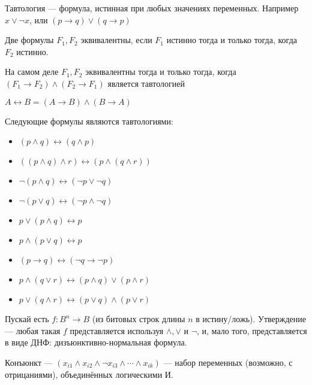 \begin{definition}
	Тавтология --- формула, истинная при любых значениях переменных. Например $x \lor \lnot x$, или $(p \to q) \lor (q \to p)$
\end{definition}
\begin{definition}
	Две формулы $F_1, F_2$ эквивалентны, если $F_1$ истинно тогда и только тогда, когда $F_2$ истинно.
\end{definition}

На самом деле $F_1, F_2$ эквивалентны тогда и только тогда, когда $(F_1 \to F_2) \land (F_2 \to F_1)$ является тавтологией

\begin{definition}
	$A \leftrightarrow B = (A \to B) \land (B \to A)$ 
\end{definition}

\begin{theorem}
	Следующие формулы являются тавтологиями:
	\begin{itemize}
		\item{$(p \land q) \leftrightarrow (q \land p)$}
		\item{$((p \land q) \land r) \leftrightarrow (p \land (q \land r))$}
		\item{$  \lnot (p \land q) \leftrightarrow (\lnot p \lor \lnot q) $}
		\item{$\lnot (p \lor q) \leftrightarrow (\lnot p \land \lnot q)$}
		\item{$p \lor (p \land q) \leftrightarrow p$}
		\item{$p \land (p \lor q) \leftrightarrow p$}
		\item{$(p \to q) \leftrightarrow (\lnot q \to \lnot p)$}
		\item{$p \land (q \lor r) \leftrightarrow (p \land q) \lor (p \land r)$}
		\item{$p \lor (q \land r) \leftrightarrow (p \lor q) \land (p \lor r)$}
	\end{itemize}
\end{theorem}

\begin{theorem}
	Пускай есть $f : B^n \to B$ (из битовых строк длины $n$ в истину/ложь). Утверждение --- любая такая $f$ представляется используя $\land, \lor $ и $\lnot$, и, мало того, представляется в виде ДНФ: дизъюнктивно-нормальная формула.
\end{theorem}

\begin{definition}
	Конъюнкт --- $(x_{i1} \land x_{i2} \land \lnot x_{i3} \land \cdots \land x_{ik})$ --- набор переменных (возможно, с отрицаниями), объединённых логическими И.
	\end{definition}

